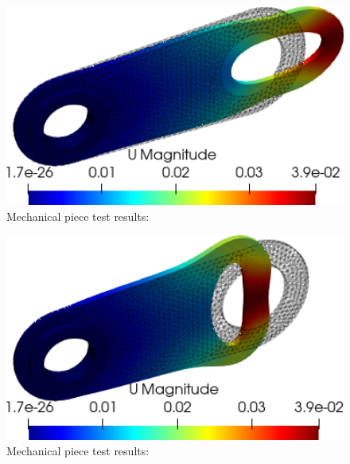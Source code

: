 \begin{figure}[htbp]
    \centering
    \begin{minipage}{0.42\textwidth}
    \includegraphics[align=b,width=1\textwidth]{./Images/3d-mechanical-result-x.png}
    \end{minipage}
    \caption{Mechanical piece test results: }
\end{figure}

\begin{figure}[htbp]
    \centering        
    \begin{minipage}{0.4\textwidth}
    \includegraphics[align=b,width=1\textwidth]{./Images/3d-mechanical-result--x.png}
    \end{minipage}
    \caption{Mechanical piece test results:}
    \label{fig:mechapieceresult2}
\end{figure}
